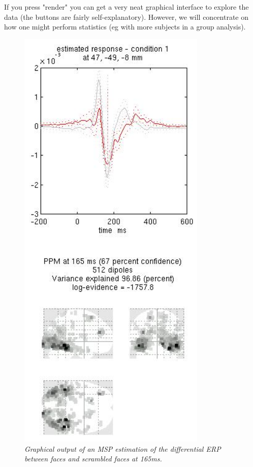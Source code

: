If you press "render" you can get a very neat graphical interface to explore the data (the buttons are fairly self-explanatory). However, we will concentrate on how one might perform statistics (eg with more subjects in a group analysis).


\begin{figure}
\begin{center}
\includegraphics[width=90mm]{multimodal/figures/figure_32_9}
\caption{\em Graphical output of an MSP estimation of the differential ERP between faces and scrambled faces at 165ms. \label{fig_32_9}}
\end{center}
\end{figure}

